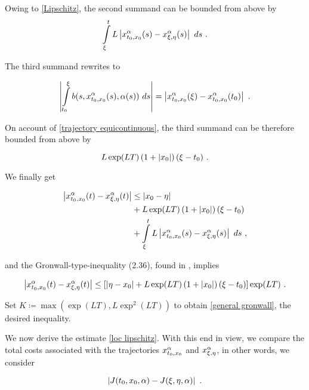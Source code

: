 Owing to \eqref{Lipschitz}, the second summand can be bounded from above by
\begin{equation*}
	\int\limits_{\xi}^{t} L \normof{\trajectory{t_0}{x_0}(s) - \trajectory{\xi}{\eta}(s)} \ ds \ .
\end{equation*}

The third summand rewrites to

\begin{equation*}
	\normof{\dynint{t_0}{\xi}{\trajectory{t_0}{x_0}}} = \normof{\trajectory{t_0}{x_0}(\xi) - \trajectory{t_0}{x_0}(t_0)} \ .
\end{equation*}

On account of \eqref{trajectory equicontinuous}, the third summand can be therefore bounded from above by

\begin{equation*}
	L \exp(LT) \left(1 + \left\lvert {x_0} \right\rvert \right) (\xi - t_0) \ .
\end{equation*}

We finally get

\begin{equation*}
	\begin{split}
	\left\lvert {x_{t_0, x_0}^{\alpha}(t) - x_{\xi, \eta}^{\alpha}(t)} \right\rvert &\leq \left\lvert {x_0 - \eta } \right\rvert \\
	&+ L \exp(LT) \left(1 + \left\lvert {x_0} \right\rvert \right) (\xi - t_0) \\
	&+ 	\int\limits_{\xi}^{t} L \left\lvert {x_{t_0, x_0}^{\alpha}(s) - x_{\xi, \eta}^{\alpha}(s)} \right\rvert \ ds \ ,
	\end{split}
\end{equation*}

and the Gronwall-type-inequality (2.36), found in \cite[p.~42]{teschl2012ordinary}, implies

\begin{multline*}
	\left\lvert {x_{t_0, x_0}^{\alpha}(t) - x_{\xi, \eta}^{\alpha}(t)} \right\rvert \leq \left[ \left\lvert {\eta - x_0} \right\rvert + L \exp(LT) \left(1 + \left\lvert {x_0} \right\rvert \right) (\xi - t_0) \right] \exp(LT) \ .
\end{multline*}

Set $ K \coloneqq \max \left(\exp(LT), L \exp^2(LT) \right) $ to obtain \eqref{general gronwall}, the desired inequality.

We now derive the estimate \eqref{loc lipschitz}. With this end in view, we compare the total costs associated with the trajectories $ x_{t_0, x_0}^{\alpha} $ and $ x_{\xi, \eta}^{\alpha} $, in other words, we consider

\begin{equation*}
	\left\lvert {J(t_0, x_0, \alpha) - J(\xi, \eta, \alpha)} \right\rvert \ .
\end{equation*}

